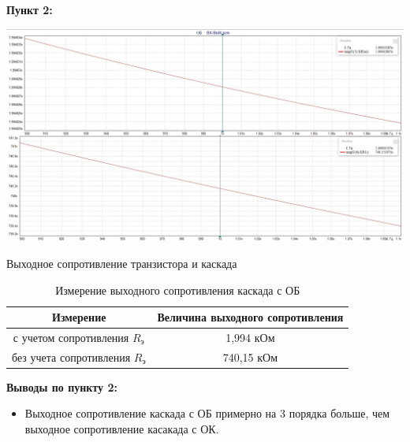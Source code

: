 \documentclass[a4paper,14pt]{extarticle}
\begin{document}
    \newpage
    \textbf{Пункт 2:}
    \begin{center}
        \includegraphics[scale=0.25]{2.jpg}
    \end{center}
    \begin{center}
        Выходное сопротивление транзистора и каскада
    \end{center}
    \begin{table}[ht]
        \begin{center}
            \caption{Измерение выходного сопротивления каскада с ОБ}
            \begin{tabular}{ |c|c| }
                \hline
                Измерение & Величина выходного сопротивления
                \tabularnewline
                \hline
                с учетом сопротивления $R_{\text{э}}$ & 1,994 кОм
                \tabularnewline
                \hline
                без учета сопротивления $R_{\text{э}}$ & 740,15 кОм
                \tabularnewline
                \hline
            \end{tabular}
        \end{center}
    \end{table}

    \textbf{Выводы по пункту 2:}
    \vspace{-6ex}
    \begin{singlespace}
        \begin{itemize}
            \item Выходное сопротивление каскада с ОБ примерно на 3 порядка больше, 
            чем выходное сопротивление касакада с ОК.
            
        \end{itemize}
    \end{singlespace}
\end{document}
